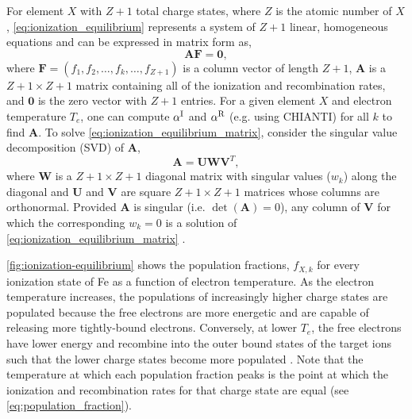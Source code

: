 For element $X$ with $Z+1$ total charge states, where $Z$ is the atomic number of $X$, \autoref{eq:ionization_equilibrium} represents a system of $Z+1$ linear, homogeneous equations and can be expressed in matrix form as,
\begin{equation}\label{eq:ionization_equilibrium_matrix}
    \mathbf{A}\mathbf{F} = \mathbf{0},
\end{equation}
where $\mathbf{F}=(f_1,f_2,\ldots,f_k,\ldots,f_{Z+1})$ is a column vector of length $Z+1$, $\mathbf{A}$ is a $Z+1{\times}Z+1$ matrix containing all of the ionization and recombination rates, and $\mathbf{0}$ is the zero vector with $Z+1$ entries. For a given element $X$ and electron temperature $T_e$, one can compute $\alpha^\textup{I}$ and $\alpha^\textup{R}$ (e.g. using CHIANTI) for all $k$ to find $\mathbf{A}$. To solve \autoref{eq:ionization_equilibrium_matrix}, consider the singular value decomposition (SVD) of $\mathbf{A}$,
\begin{equation}
    \mathbf{A} = \mathbf{U}\mathbf{W}\mathbf{V}^T,
\end{equation}
where $\mathbf{W}$ is a $Z+1{\times}Z+1$ diagonal matrix with singular values ($w_k$) along the diagonal and $\mathbf{U}$ and $\mathbf{V}$ are  square $Z+1{\times}Z+1$ matrices whose columns are orthonormal. Provided $\mathbf{A}$ is singular (i.e. $\det{(\mathbf{A})}=0$), any column of $\mathbf{V}$ for which the corresponding $w_k=0$ is a solution of \autoref{eq:ionization_equilibrium_matrix} \citep{press_numerical_1992}. 

\autoref{fig:ionization-equilibrium} shows the population fractions, $f_{X,k}$ for every ionization state of Fe as a function of electron temperature. As the electron temperature increases, the populations of increasingly higher charge states are populated because the free electrons are more energetic and are capable of releasing more tightly-bound electrons. Conversely, at lower $T_e$, the free electrons have lower energy and recombine into the outer bound states of the target ions such that the lower charge states become more populated \citep{bradshaw_collisional_2013}. Note that the temperature at which each population fraction peaks is the point at which the ionization and recombination rates for that charge state are equal (see \autoref{eq:population_fraction}).

